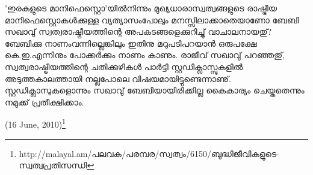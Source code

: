 'ഇരകളുടെ മാനിഫെസ്റ്റൊ'യില്‍നിന്നും മുഖ്യധാരാസ്വത്വങ്ങളുടെ രാഷ്ട്രീയ മാനിഫെസ്റ്റൊകള്‍ക്കുള്ള വ്യത്യാസംപോലും 
മനസ്സിലാക്കാതെയാണോ ബേബി സഖാവു് സ്വത്വരാഷ്ട്രീയത്തിന്റെ അപകടങ്ങളെക്കുറിച്ചു് വാചാലനായതു്? ബേബിക്കു 
നാണംവന്നില്ലെങ്കിലും ഇതിനു മറുപടിപറയാന്‍ ഒരുപക്ഷേ കെ.ഇ.എന്നിനും പോക്കര്‍ക്കും നാണം കാണും. 
രാജീവ് സഖാവു് പറഞ്ഞതു്, സ്വത്വരാഷ്ട്രീയത്തിന്റെ ചതിക്കുഴികള്‍ പാര്‍ട്ടി സ്റ്റഡിക്ലാസ്സുകളില്‍ അടുത്തകാലത്തായി 
നല്ലപോലെ വിഷയമായിട്ടുണ്ടെന്നാണു്. സ്റ്റഡിക്ലാസുകളൊന്നും സഖാവു് ബേബിയായിരിക്കില്ല കൈകാര്യം 
ചെയ്തതെന്നും നമുക്ക് പ്രതീക്ഷിക്കാം.

\begin{flushright}(16 June, 2010)\footnote{http://malayal.am/പലവക/പരമ്പര/സ്വത്വം/6150/ബുദ്ധിജീവികളുടെ-സ്വത്വപ്രതിസന്ധി}\end{flushright}

\newpage
